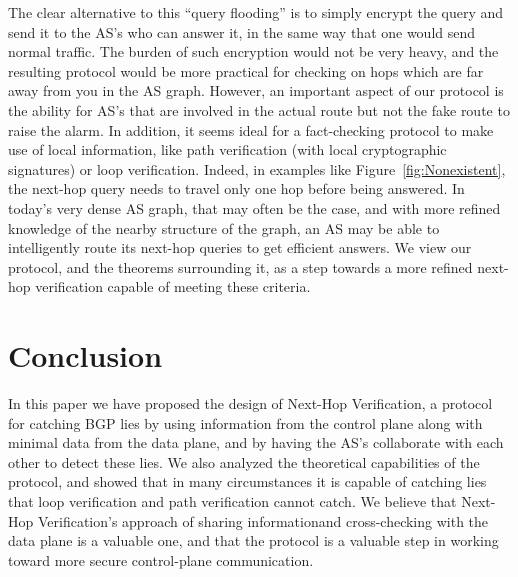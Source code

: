 \documentclass[10pt]{article}
\begin{document}
  The clear alternative to this ``query flooding'' is to simply encrypt the
  query and send it to the AS's who can answer it, in the same way that
  one would send normal traffic.
  The burden of such encryption would not be very heavy, and the
  resulting protocol would be more practical for checking on hops which
  are far away from you in the AS graph.
  However, an important aspect of our protocol is the ability for AS's that
  are involved in the actual route but not the fake route to raise the alarm.
  In addition, it seems ideal for a fact-checking protocol to make use of local
  information, like path verification (with local cryptographic signatures)
  or loop verification.
  Indeed, in examples like Figure~\ref{fig:Nonexistent}, the next-hop query
  needs to travel only one hop before being answered.
  In today's very dense AS graph, that may often be the case,
  and with more refined knowledge of the nearby structure of the graph,
  an AS may be able to intelligently route its next-hop queries to get efficient
  answers. We view our protocol, and the theorems surrounding it, as a step
  towards a more refined next-hop verification capable of meeting these
  criteria.


\section{Conclusion}
In this paper we have proposed the design of Next-Hop Verification, a protocol for catching BGP lies by using information from the control plane along with minimal data from the data plane, and by having the AS's collaborate with each other to detect these lies. We also analyzed the theoretical capabilities of the protocol, and showed that in many circumstances it is capable of catching lies that loop verification and path verification cannot catch. We believe that Next-Hop Verification's approach of sharing informationand cross-checking with the data plane is a valuable one, and that the protocol is a valuable step in working toward more secure control-plane communication.


{}


\clearpage
\end{document}
